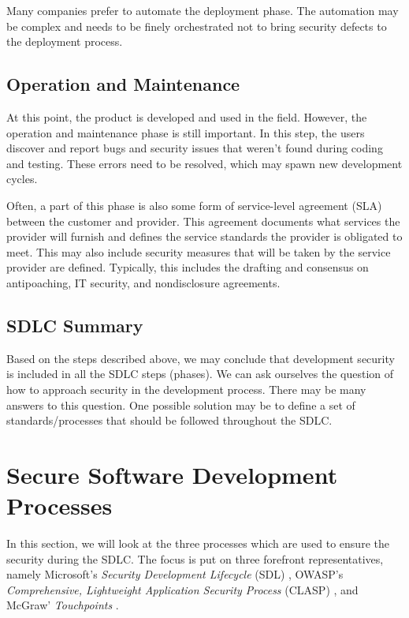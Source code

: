 \documentclass[12pt,a4,twoside]{article}
\begin{document}
Many companies prefer to automate the deployment phase. The automation may be complex and needs to be finely orchestrated not to bring security defects to the deployment process. \cite{sdlc_phoenix}

\subsection{Operation and Maintenance}

At this point, the product is developed and used in the field. However, the operation and maintenance phase is still important. In this step, the users discover and report bugs and security issues that weren't found during coding and testing. These errors need to be resolved, which may spawn new development cycles. \cite{sdlc_phoenix}

Often, a part of this phase is also some form of service-level agreement (SLA) between the customer and provider. This agreement documents what services the provider will furnish and defines the service standards the provider is obligated to meet. This may also include security measures that will be taken by the service provider are defined. Typically, this includes the drafting and consensus on antipoaching, IT security, and nondisclosure agreements. \cite{sla}

\subsection{SDLC Summary}

Based on the steps described above, we may conclude that development security is included in all the SDLC steps (phases). We can ask ourselves the question of how to approach security in the development process. There may be many answers to this question. One possible solution may be to define a set of standards/processes that should be followed throughout the SDLC.

\section{Secure Software Development Processes}
\label{sec:ssdp}

In this section, we will look at the three processes which are used to ensure the security during the SDLC. The focus is put on three forefront representatives, namely Microsoft's \textit{Security Development Lifecycle} (SDL) \cite{microsoft_sdl}, OWASP’s \textit{Comprehensive, Lightweight Application Security Process} (CLASP) \cite{owasp}, and McGraw' \textit{Touchpoints} \cite{mcgraw2004software}.
\end{document}
